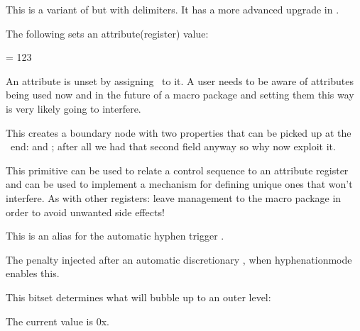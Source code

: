This is a variant of  but with delimiters. It has a more advanced
upgrade in .

\stopoldprimitive

\startnewprimitive[title={\prm {attribute}}]

The following sets an attribute(register) value:

\starttyping
{} = 123
\stoptyping

An attribute is unset by assigning \the \attributeunsetvalue\ to it. A user needs
to be aware of attributes being used now and in the future of a macro package and
setting them this way is very likely going to interfere.

\stopnewprimitive

\startnewprimitive[title={\prm {attributeboundary}}]

This creates a boundary node with two properties that can be picked up at the
\LUA\ end:  and ; after all we had that second
field anyway so why now exploit it.

\stopnewprimitive

\startnewprimitive[title={\prm {attributedef}}]

This primitive can be used to relate a control sequence to an attribute register
and can be used to implement a mechanism for defining unique ones that won't
interfere. As with other registers: leave management to the macro package in
order to avoid unwanted side effects!

\stopnewprimitive

\startnewprimitive[title={\prm {automaticdiscretionary}}]

This is an alias for the automatic hyphen trigger \type {-}.

\stopnewprimitive

\startnewprimitive[title={\prm {automatichyphenpenalty}}]

The penalty injected after an automatic discretionary \type {-}, when \prm
{hyphenationmode} enables this.

\stopnewprimitive

\startnewprimitive[title={\prm {automigrationmode}}]

This bitset determines what will bubble up to an outer level:


The current value is {\tttf 0x\tohexadecimal\automigrationmode}.

\stopnewprimitive

